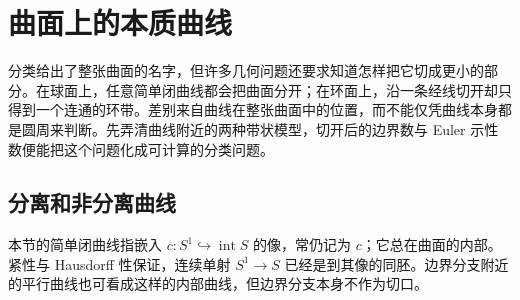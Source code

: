 
% 
% 
% 

\section{曲面上的本质曲线}
\label{g1:sec:0606}

分类给出了整张曲面的名字，但许多几何问题还要求知道怎样把它切成更小的部分。在球面上，任意简单闭曲线都会把曲面分开；在环面上，沿一条经线切开却只得到一个连通的环带。差别来自曲线在整张曲面中的位置，而不能仅凭曲线本身都是圆周来判断。先弄清曲线附近的两种带状模型，切开后的边界数与 Euler 示性数便能把这个问题化成可计算的分类问题。

\subsection{分离和非分离曲线}
\label{g1:subsec:0606:01}

本节的简单闭曲线指嵌入 \(c:S^1\hookrightarrow\operatorname{int}S\) 的像，常仍记为 \(c\)；它总在曲面的内部。紧性与 Hausdorff 性保证，连续单射 \(S^1\rightarrow S\) 已经是到其像的同胚。边界分支附近的平行曲线也可看成这样的内部曲线，但边界分支本身不作为切口。

